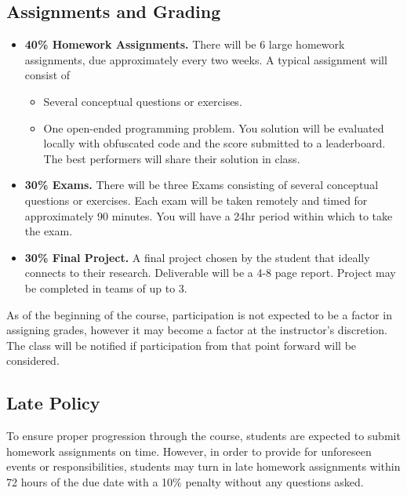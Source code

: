 \documentclass[9pt]{article}
\begin{document}
\begin{samepage}
\section*{Assignments and Grading}

\begin{itemize}[noitemsep]
    \item \textbf{40\% Homework Assignments.}
There will be 6 large homework assignments, due approximately every two weeks. A typical assignment will consist of
\begin{itemize}[nosep]
    \item Several conceptual questions or exercises.
    \item One open-ended programming problem. You solution will be evaluated locally with obfuscated code and the score submitted to a leaderboard. The best performers will share their solution in class.
\end{itemize}

\item \textbf{30\% Exams.}
There will be three Exams consisting of several conceptual questions or exercises. Each exam will be taken remotely and timed for approximately 90 minutes. You will have a 24hr period within which to take the exam.

\item \textbf{30\% Final Project.}
A final project chosen by the student that ideally connects to their research. Deliverable will be a 4-8 page report. Project may be completed in teams of up to 3.
\end{itemize}
As of the beginning of the course, participation is not expected to be a factor in assigning grades, however it may become a factor at the instructor's discretion. The class will be notified if participation from that point forward will be considered.
\end{samepage}

\subsection*{Late Policy}

To ensure proper progression through the course, students are expected to submit homework assignments on time. However, in order to provide for unforeseen events or responsibilities, students may turn in late homework assignments within 72 hours of the due date with a 10\% penalty without any questions asked.
\end{document}
